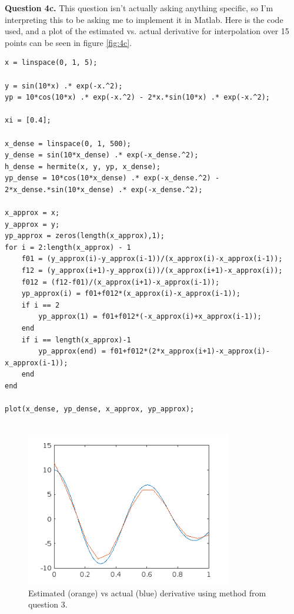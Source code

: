 \documentclass[letterpaper, reqno,11pt]{article}
\begin{document}
{\medskip\noindent\bf Question 4c.} This question isn't actually asking anything specific, so I'm interpreting this to be asking me to implement it in Matlab. Here is the code used, and a plot of the estimated vs. actual derivative for interpolation over 15 points can be seen in figure \ref{fig:4c}.

\begin{lstlisting}
x = linspace(0, 1, 5);

y = sin(10*x) .* exp(-x.^2);
yp = 10*cos(10*x) .* exp(-x.^2) - 2*x.*sin(10*x) .* exp(-x.^2);

xi = [0.4];

x_dense = linspace(0, 1, 500);
y_dense = sin(10*x_dense) .* exp(-x_dense.^2);
h_dense = hermite(x, y, yp, x_dense);
yp_dense = 10*cos(10*x_dense) .* exp(-x_dense.^2) - 2*x_dense.*sin(10*x_dense) .* exp(-x_dense.^2);

x_approx = x;
y_approx = y;
yp_approx = zeros(length(x_approx),1);
for i = 2:length(x_approx) - 1
    f01 = (y_approx(i)-y_approx(i-1))/(x_approx(i)-x_approx(i-1));
    f12 = (y_approx(i+1)-y_approx(i))/(x_approx(i+1)-x_approx(i));
    f012 = (f12-f01)/(x_approx(i+1)-x_approx(i-1));
    yp_approx(i) = f01+f012*(x_approx(i)-x_approx(i-1));
    if i == 2
        yp_approx(1) = f01+f012*(-x_approx(i)+x_approx(i-1));
    end
    if i == length(x_approx)-1
        yp_approx(end) = f01+f012*(2*x_approx(i+1)-x_approx(i)-x_approx(i-1));
    end
end

plot(x_dense, yp_dense, x_approx, yp_approx);


\end{lstlisting}

\begin{figure}[htpb]
    \centering
    \includegraphics[width=0.8\textwidth]{q4c}
    \caption{Estimated (orange) vs actual (blue) derivative using method from question 3.}
    \label{fig:q4c}
\end{figure}
\end{document}
